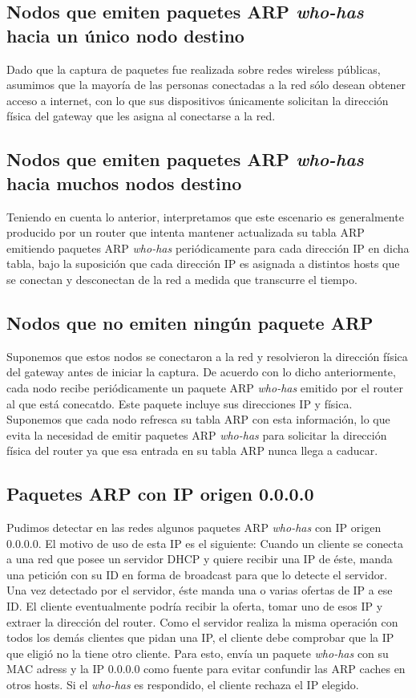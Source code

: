 \documentclass[10pt, a4paper]{article}
\begin{document}
\subsection{Nodos que emiten paquetes ARP \textit{who-has} hacia un único nodo destino}

Dado que la captura de paquetes fue realizada sobre redes wireless públicas, asumimos que la mayoría de las personas conectadas a la red sólo desean obtener acceso a internet, con lo que sus dispositivos únicamente solicitan la dirección física del gateway que les asigna al conectarse a la red.


\subsection{Nodos que emiten paquetes ARP \textit{who-has} hacia muchos nodos destino}

Teniendo en cuenta lo anterior, interpretamos que este escenario es generalmente producido por un router que intenta mantener actualizada su tabla ARP emitiendo paquetes ARP \textit{who-has} periódicamente para cada dirección IP en dicha tabla, bajo la suposición que cada dirección IP es asignada a distintos hosts que se conectan y desconectan de la red a medida que transcurre el tiempo.


\subsection{Nodos que no emiten ningún paquete ARP}

Suponemos que estos nodos se conectaron a la red y resolvieron la dirección física del gateway antes de iniciar la captura. De acuerdo con lo dicho anteriormente, cada nodo recibe periódicamente un paquete ARP \textit{who-has} emitido por el router al que está conecatdo. Este paquete incluye sus direcciones IP y física. Suponemos que cada nodo refresca su tabla ARP con esta información, lo que evita la necesidad de emitir paquetes ARP \textit{who-has} para solicitar la dirección física del router ya que esa entrada en su tabla ARP nunca llega a caducar.


\subsection{Paquetes ARP con IP origen 0.0.0.0}

Pudimos detectar en las redes algunos paquetes ARP \textit{who-has} con IP origen 0.0.0.0.
El motivo de uso de esta IP es el siguiente:
Cuando un cliente se conecta a una red que posee un servidor DHCP y quiere recibir una IP de éste, manda una petición con su ID en forma de broadcast para que lo detecte el servidor. Una vez detectado por el servidor, éste manda una o varias ofertas de IP a ese ID.
El cliente eventualmente podría recibir la oferta, tomar uno de esos IP y extraer la dirección del router.
Como el servidor realiza la misma operación con todos los demás clientes que pidan una IP, el cliente debe comprobar que la IP que eligió no la tiene otro cliente. Para esto, envía un paquete \textit{who-has} con su MAC adress y la IP 0.0.0.0 como fuente para evitar confundir las ARP caches en otros hosts. Si el \textit{who-has} es respondido, el cliente rechaza el IP elegido.
\end{document}
